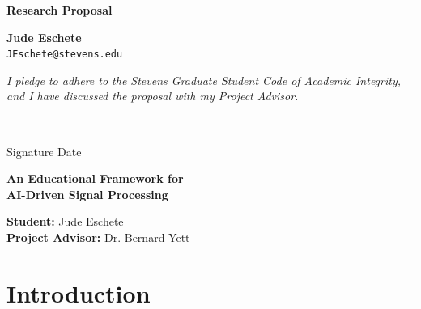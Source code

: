\documentclass[10pt]{article}
\begin{document}
	
	\begin{center}
		\vspace*{2in}
		
		{\Large\textbf{Research Proposal}}
		
		\vspace{1in}
		
		\textbf{Jude Eschete}\\
		\texttt{JEschete@stevens.edu}
		
		\vspace{2in}
		
		\textit{I pledge to adhere to the Stevens Graduate Student Code of Academic Integrity, and I have discussed the proposal with my Project Advisor.}
		
		\vspace{1in}
		
		\rule{3in}{0.4pt}\\
		Signature \hspace{2in} Date
		
	\end{center}
	
	\newpage
	
	
	\begin{center}
		{\fontsize{24}{28}\selectfont\textbf{An Educational Framework for \\ AI-Driven Signal Processing}}
	\end{center}
	\vspace{0.5em}
	
	\noindent\textbf{Student:} Jude Eschete\\
	\textbf{Project Advisor:} Dr. Bernard Yett
	
	\vspace{1em}
	
	\section{Introduction}
	
\end{document}
